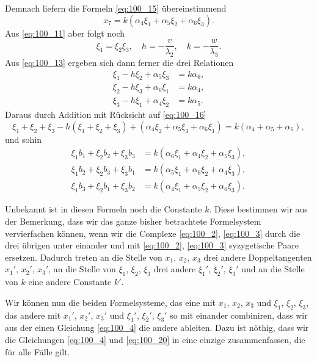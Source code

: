 \documentclass[12pt,a4paper]{article}
\theoremstyle{plain}
\theoremstyle{definition}
\theoremstyle{remark}
\begin{document}
Demnach liefern die Formeln \eqref{eq:100_15} übereinstimmend
\begin{equation}\label{eq:100_16}
x_7 = k(\alpha_4 \xi_1 + \alpha_5 \xi_2 + \alpha_6 \xi_3).
\end{equation}
Aus \eqref{eq:100_11} aber folgt noch
\begin{equation}\label{eq:100_17}
\xi_1 = \xi_2 \xi_3, \quad h = -\frac{v}{\lambda_2}, \quad k = -\frac{w}{\lambda_3}.
\end{equation}
Aus \eqref{eq:100_13} ergeben sich dann ferner die drei Relationen
\begin{equation*}\label{eq:100_18}
\begin{aligned}
\xi_1 - h \xi_2 + \alpha_5 \xi_3 &= k \alpha_6, \\
\xi_2 - h \xi_3 + \alpha_6 \xi_1 &= k \alpha_4, \\
\xi_3 - h \xi_1 + \alpha_4 \xi_2 &= k \alpha_5.
\end{aligned}
\end{equation*}
Daraus durch Addition mit Rücksicht auf \eqref{eq:100_16}
\begin{equation*}\label{eq:100_19}
\xi_1 + \xi_2 + \xi_3 - h(\xi_1 + \xi_2 + \xi_3) + (\alpha_4 \xi_2 + \alpha_5 \xi_3 + \alpha_6 \xi_1) = k(\alpha_4 + \alpha_5 + \alpha_6),
\end{equation*}
und sohin
\begin{equation}\label{eq:100_20}
\begin{aligned}
\xi_1 b_1 + \xi_2 b_2 + \xi_3 b_3 &= k(\alpha_6 \xi_1 + \alpha_4 \xi_2 + \alpha_5 \xi_3), \\
\xi_1 b_2 + \xi_2 b_3 + \xi_3 b_1 &= k(\alpha_5 \xi_1 + \alpha_6 \xi_2 + \alpha_4 \xi_3), \\
\xi_1 b_3 + \xi_2 b_1 + \xi_3 b_2 &= k(\alpha_4 \xi_1 + \alpha_5 \xi_2 + \alpha_6 \xi_3).
\end{aligned}
\end{equation}

Unbekannt ist in diesen Formeln noch die Constante $k$.
Diese bestimmen wir aus der Bemerkung, dass wir das ganze
bisher betrachtete Formelsystem vervierfachen können, wenn wir
die Complexe \eqref{eq:100_2}, \eqref{eq:100_3} durch die drei übrigen unter einander
und mit \eqref{eq:100_2}, \eqref{eq:100_3} syzygetische Paare ersetzen. Dadurch treten an die
Stelle von $x_1$, $x_2$, $x_3$ drei andere Doppeltangenten $x_1'$, $x_2'$, $x_3'$,
an die Stelle von $\xi_1$, $\xi_2$, $\xi_3$ drei andere $\xi_1'$, $\xi_2'$, $\xi_3'$ und an die
Stelle von $k$ eine andere Constante $k'$.

Wir können nun die beiden Formelsysteme, das eine mit
$x_1$, $x_2$, $x_3$ und $\xi_1$, $\xi_2$, $\xi_3$, das andere mit $x_1'$, $x_2'$, $x_3'$ und
$\xi_1'$, $\xi_2'$, $\xi_3'$ so mit einander combiniren, dass wir aus der einen
Gleichung \eqref{eq:100_4} die andere ableiten. Dazu ist nöthig, dass wir die
Gleichungen \eqref{eq:100_4} und \eqref{eq:100_20} in eine einzige zusammenfassen, die für
alle Fälle gilt.
\end{document}
